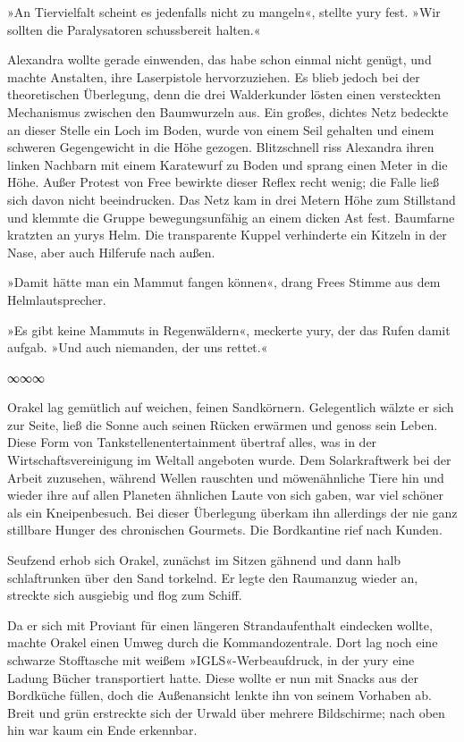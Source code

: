 »An Tiervielfalt scheint es jedenfalls nicht zu mangeln«, stellte yury fest. »Wir sollten die Paralysatoren schussbereit halten.«

Alexandra wollte gerade einwenden, das habe schon einmal nicht genügt, und machte Anstalten, ihre Laserpistole hervorzuziehen. Es blieb jedoch bei der theoretischen Überlegung, denn die drei Walderkunder lösten einen versteckten Mechanismus zwischen den Baumwurzeln aus. Ein großes, dichtes Netz bedeckte an dieser Stelle ein Loch im Boden, wurde von einem Seil gehalten und einem schweren Gegengewicht in die Höhe gezogen. Blitzschnell riss Alexandra ihren linken Nachbarn mit einem Karatewurf zu Boden und sprang einen Meter in die Höhe. Außer Protest von Free bewirkte dieser Reflex recht wenig; die Falle ließ sich davon nicht beeindrucken. Das Netz kam in drei Metern Höhe zum Stillstand und klemmte die Gruppe bewegungsunfähig an einem dicken Ast fest. Baumfarne kratzten an yurys Helm. Die transparente Kuppel verhinderte ein Kitzeln in der Nase, aber auch Hilferufe nach außen.

»Damit hätte man ein Mammut fangen können«, drang Frees Stimme aus dem Helmlautsprecher.

»Es gibt keine Mammuts in Regenwäldern«, meckerte yury, der das Rufen damit aufgab. »Und auch niemanden, der uns rettet.«

\begin{center}
∞∞∞
\end{center}

Orakel lag gemütlich auf weichen, feinen Sandkörnern. Gelegentlich wälzte er sich zur Seite, ließ die Sonne auch seinen Rücken erwärmen und genoss sein Leben. Diese Form von Tankstellenentertainment übertraf alles, was in der Wirtschaftsvereinigung im Weltall angeboten wurde. Dem Solarkraftwerk bei der Arbeit zuzusehen, während Wellen rauschten und möwenähnliche Tiere hin und wieder ihre auf allen Planeten ähnlichen Laute von sich gaben, war viel schöner als ein Kneipenbesuch. Bei dieser Überlegung überkam ihn allerdings der nie ganz stillbare Hunger des chronischen Gourmets. Die Bordkantine rief nach Kunden.

Seufzend erhob sich Orakel, zunächst im Sitzen gähnend und dann halb schlaftrunken über den Sand torkelnd. Er legte den Raumanzug wieder an, streckte sich ausgiebig und flog zum Schiff.

Da er sich mit Proviant für einen längeren Strandaufenthalt eindecken wollte, machte Orakel einen Umweg durch die Kommandozentrale. Dort lag noch eine schwarze Stofftasche mit weißem »IGLS«-Werbeaufdruck, in der yury eine Ladung Bücher transportiert hatte. Diese wollte er nun mit Snacks aus der Bordküche füllen, doch die Außenansicht lenkte ihn von seinem Vorhaben ab. Breit und grün erstreckte sich der Urwald über mehrere Bildschirme; nach oben hin war kaum ein Ende erkennbar.

